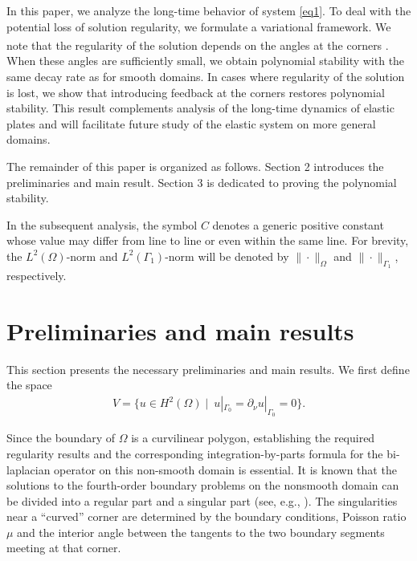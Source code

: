 \documentclass[twoside]{article}
\theoremstyle{noparens}
\theoremstyle{definition}
\numberwithin{equation}{section}
\numberwithin{figure}{section}
\newcommand{\citeup}[1]{\textsuperscript{\cite{#1}}}
\begin{document}
In this paper, we analyze the long-time behavior of system \eqref{eq1}. To deal with the potential loss of solution regularity, we formulate a variational framework. We note that the regularity of the solution depends on the angles at the corners \citeup{blum}. When these angles are sufficiently small, we obtain polynomial stability with the same decay rate as for smooth domains. In cases where regularity of the solution is lost, we show that introducing feedback at the corners restores polynomial stability. This result complements analysis of the long-time dynamics of elastic plates and will   facilitate future study of the elastic system on more general domains.


The remainder of this paper is organized as follows. Section 2 introduces the preliminaries and main result.   Section 3 is dedicated to proving the polynomial stability.

In the subsequent analysis, the symbol $C$ denotes a generic positive constant whose value may differ from line to line or even within the same line.
For brevity, the $L^2(\Omega)$-norm and $L^2(\Gamma_1)$-norm will be denoted by $\|\cdot\|_{\Omega}$ and $\|\cdot\|_{\Gamma_1}$, respectively.

\section{Preliminaries and main results}

This section presents the necessary  preliminaries and main results. We first define the space
\begin{align*}
	V=\big\{u\in H^{2}(\Omega)\; \big|\; \ u|_{\Gamma_{0}}= \partial_{\nu} u|_{\Gamma_{0}}=0\big\}.
\end{align*}


Since the boundary of $\Omega$ is a curvilinear
polygon,   establishing the required regularity results and the corresponding integration-by-parts formula for the bi-laplacian operator on this non-smooth domain is essential. It is  known that the solutions to the
fourth-order boundary problems on the nonsmooth domain can be divided
into a regular part and a singular part (see, e.g.,
\cite{blum,dauge,grisvard,nicaise92}).
The singularities near a ``curved'' corner are determined  by the boundary conditions, Poisson ratio $\mu$ and the interior angle between the tangents to the two boundary segments meeting at that corner.
\end{document}
